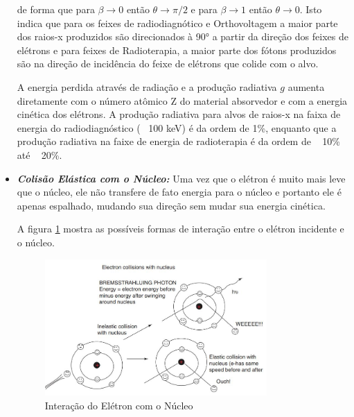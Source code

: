 \documentclass[11pt,a4paper]{article}
\begin{document}
\begin{itemize}
                de forma que para $\beta \rightarrow 0$ então $\theta \rightarrow \pi / 2$ e para $\beta \rightarrow 1$ então $\theta \rightarrow 0$. Isto indica que para os feixes de radiodiagnótico e Orthovoltagem a maior parte dos raios-x produzidos são direcionados à \ang{90} a partir da direção dos feixes de elétrons e para feixes de Radioterapia, a maior parte dos fótons produzidos são na direção de incidência do feixe de elétrons que colide com o alvo. 

                A energia perdida através de radiação e a produção radiativa $g$ aumenta diretamente com o número atômico Z do material absorvedor e com a energia cinética dos elétrons. A produção radiativa para alvos de raios-x na faixa de energia do radiodiagnóstico (~ 100 keV) é da ordem de 1\%, enquanto que a produção radiativa na faixe de energia de radioterapia é da ordem de ~ 10\% até ~ 20\%. 

                \item \textbf{\textit{\textcolor{CarnationPink}{Colisão Elástica com o Núcleo}:}} Uma vez que o elétron é muito mais leve que o núcleo, ele não transfere de fato energia para o núcleo e portanto ele é apenas espalhado, mudando sua direção sem mudar sua energia cinética. 
                
                A figura \ref{fig:interacaoEletronNucleo} mostra as possíveis formas de interação entre o elétron incidente e o núcleo.

                \begin{figure}[h]
                    \centering
                    \includegraphics[width=0.8\textwidth]{Imagens/interacaoEletronNucleo.JPG}
                    \caption{Interação do Elétron com o Núcleo}
                    \label{fig:interacaoEletronNucleo}                
                \end{figure}

                
            \end{itemize}
\end{document}
